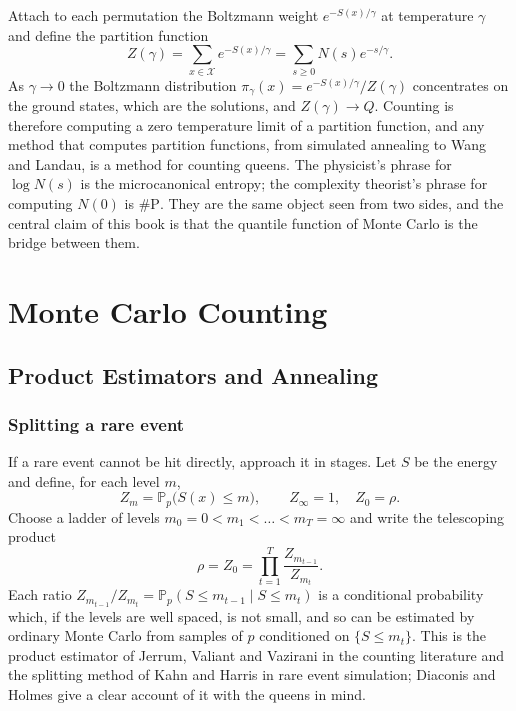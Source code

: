 \documentclass[11pt,twoside,openany]{book}
\theoremstyle{plain}
\theoremstyle{definition}
\theoremstyle{remark}
\newcommand{\PP}{\mathbb{P}}
\newcommand{\cX}{\mathcal{X}}
\newcommand{\sharpP}{\#\mathrm{P}}
\begin{document}
Attach to each permutation the Boltzmann weight $e^{-S(x)/\gamma}$ at temperature $\gamma$ and define the partition function
\[
Z(\gamma) = \sum_{x \in \cX} e^{-S(x)/\gamma} = \sum_{s \ge 0} N(s) e^{-s/\gamma} .
\]
As $\gamma \to 0$ the Boltzmann distribution $\pi_\gamma(x) = e^{-S(x)/\gamma} / Z(\gamma)$ concentrates on the ground states, which are the solutions, and $Z(\gamma) \to Q$. Counting is therefore computing a zero temperature limit of a partition function, and any method that computes partition functions, from simulated annealing to Wang and Landau, is a method for counting queens. The physicist's phrase for $\log N(s)$ is the microcanonical entropy; the complexity theorist's phrase for computing $N(0)$ is $\sharpP$. They are the same object seen from two sides, and the central claim of this book is that the quantile function of Monte Carlo is the bridge between them.







\part{Monte Carlo Counting}

\chapter{Product Estimators and Annealing}
\label{ch:product}

\section{Splitting a rare event}

If a rare event cannot be hit directly, approach it in stages. Let $S$ be the energy and define, for each level $m$,
\[
Z_m = \PP_p\big( S(x) \le m \big) , \qquad Z_\infty = 1, \quad Z_0 = \rho .
\]
Choose a ladder of levels $m_0 = 0 < m_1 < \dots < m_T = \infty$ and write the telescoping product
\[
\rho = Z_0 = \prod_{t=1}^{T} \frac{Z_{m_{t-1}}}{Z_{m_t}} .
\]
Each ratio $Z_{m_{t-1}} / Z_{m_t} = \PP_p(S \le m_{t-1} \mid S \le m_t)$ is a conditional probability which, if the levels are well spaced, is not small, and so can be estimated by ordinary Monte Carlo from samples of $p$ conditioned on $\{S \le m_t\}$. This is the product estimator of Jerrum, Valiant and Vazirani in the counting literature and the splitting method of Kahn and Harris in rare event simulation; Diaconis and Holmes give a clear account of it with the queens in mind.
\end{document}
